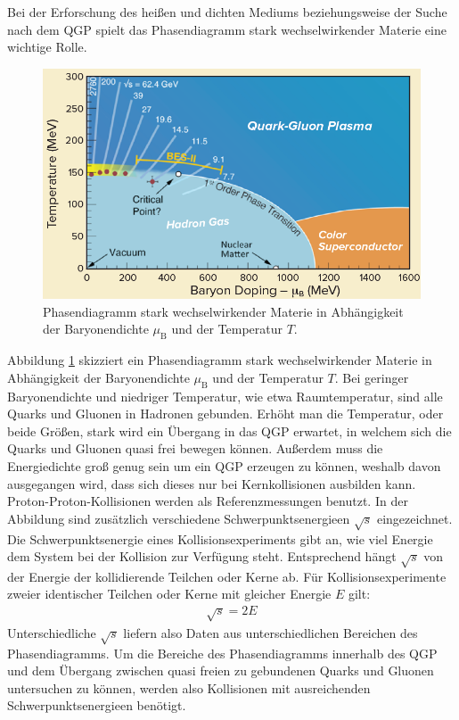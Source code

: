 Bei der Erforschung des hei{\ss}en und dichten Mediums beziehungsweise der Suche nach dem QGP spielt das Phasendiagramm stark wechselwirkender Materie eine wichtige Rolle.
\begin{figure}[tbp]
\centering
\includegraphics[width=.7\linewidth]{QGPPhaseDiagram.png}
\caption{Phasendiagramm stark wechselwirkender Materie in Abh\"angigkeit der Baryonendichte $\mu_{\text{B}}$ und der Temperatur $T$.
\cite{PAPER:1}}
\label{fig:QGPPhase}
\end{figure}
Abbildung \ref{fig:QGPPhase} skizziert ein Phasendiagramm stark wechselwirkender Materie in Abh\"angigkeit der Baryonendichte $\mu_{\text{B}}$ und der Temperatur $T$.
Bei geringer Baryonendichte und niedriger Temperatur, wie etwa Raumtemperatur, sind alle Quarks und Gluonen in Hadronen gebunden.
Erh\"oht man die Temperatur, oder beide Gr\"o{\ss}en, stark wird ein \"Ubergang in das QGP erwartet, in welchem sich die Quarks und Gluonen quasi frei bewegen k\"onnen.
Au{\ss}erdem muss die Energiedichte gro{\ss} genug sein um ein QGP erzeugen zu k\"onnen, weshalb davon ausgegangen wird, dass sich dieses nur bei Kernkollisionen ausbilden kann.
Proton-Proton-Kollisionen werden als Referenzmessungen benutzt.
\newline
In der Abbildung sind zus\"atzlich verschiedene Schwerpunktsenergieen $\sqrt{s}$ eingezeichnet.
Die Schwerpunktsenergie eines Kollisionsexperiments gibt an, wie viel Energie dem System bei der Kollision zur Verf\"ugung steht.
Entsprechend h\"angt $\sqrt{s}$ von der Energie der kollidierende Teilchen oder Kerne ab.
F\"ur Kollisionsexperimente zweier identischer Teilchen oder Kerne mit gleicher Energie $E$ gilt:
\begin{align}
\sqrt{s} = 2E \label{eq:sqrts}
\end{align}
Unterschiedliche $\sqrt{s}$ liefern also Daten aus unterschiedlichen Bereichen des Phasendiagramms.
Um die Bereiche des Phasendiagramms innerhalb des QGP und dem \"Ubergang zwischen quasi freien zu gebundenen Quarks und Gluonen untersuchen zu k\"onnen, werden also Kollisionen mit ausreichenden Schwerpunktsenergieen ben\"otigt.
